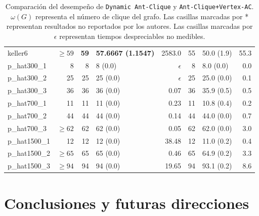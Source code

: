\documentclass[conference]{IEEEtran}
\begin{document}
\begin{center}
\begin{table}[ht]
{\begin{tabular}{lr|rlr|rlr}
 keller6           &    $\geq 59$  &  \textbf{59}  &  \textbf{57.6667 (1.1547)}  &       2583.0  &    55  &  50.0 (1.9)     &        55.3  \\
 p\_hat300\_1      &            8  &            8  &  8 (0.0)                    &   $\epsilon$  &     8  &  8.0 (0.0)      &         0.0  \\
 p\_hat300\_2      &           25  &           25  &  25 (0.0)                   &   $\epsilon$  &    25  &  25.0 (0.0)     &         0.1  \\
 p\_hat300\_3      &           36  &           36  &  36 (0.0)                   &         0.07  &    36  &  35.9 (0.5)     &         0.5  \\
 p\_hat700\_1      &           11  &           11  &  11 (0.0)                   &         0.23  &    11  &  10.8 (0.4)     &         0.2  \\
 p\_hat700\_2      &           44  &           44  &  44 (0.0)                   &         0.14  &    44  &  44.0 (0.0)     &         0.7  \\
 p\_hat700\_3      &    $\geq 62$  &           62  &  62 (0.0)                   &         0.05  &    62  &  62.0 (0.0)     &         3.0  \\
 p\_hat1500\_1     &           12  &           12  &  12 (0.0)                   &        38.48  &    12  &  11.0 (0.2)     &         0.4  \\
 p\_hat1500\_2     &    $\geq 65$  &           65  &  65 (0.0)                   &         0.46  &    65  &  64.9 (0.2)     &         3.3  \\
 p\_hat1500\_3     &    $\geq 94$  &           94  &  94 (0.0)                   &        19.65  &    94  &  93.1 (0.2)     &         8.6  \\
\hline
\end{tabular}}
\hfill{}
\caption{Comparación del desempeño de \texttt{Dynamic Ant-Clique} y
  \texttt{Ant-Clique+Vertex-AC}. $\omega(G)$ representa el número de
  clique del grafo. Las casillas marcadas por * representan resultados
no reportados por los autores. Las casillas marcadas por $\epsilon$
representan tiempos despreciables no medibles.}
\label{tb:aco}
\end{table}
\end{center}


\section{Conclusiones y futuras direcciones}
\label{sec:conclusions}











\end{document}
